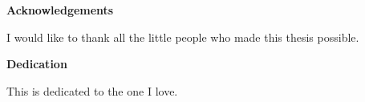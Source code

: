 
\begin{center}\textbf{Acknowledgements}\end{center}

I would like to thank all the little people who made this thesis possible.
\cleardoublepage


\begin{center}\textbf{Dedication}\end{center}

This is dedicated to the one I love.
\cleardoublepage

\renewcommand\contentsname{Table of Contents}
\tableofcontents
\cleardoublepage
{}    %

\listoftables
\cleardoublepage
{}		%

\listoffigures
\cleardoublepage
{}		%

\printglossaries
\cleardoublepage
{}		%


